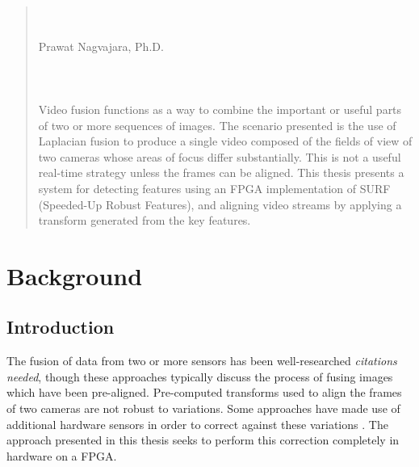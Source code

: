 \documentclass{article}
\begin{document}
\setcounter{page}{2}
\begin{center}
    \tableofcontents
    \clearpage
    
    \listoftables
    \clearpage
    
    \listoffigures
\end{center}
\clearpage

\hfill \\
\hfill \\
\hfill \\
\hfill \\


\begin{abstract}
    \singlespacing
    \centering
    \thetitle \\
    \theauthor \\
    Prawat Nagvajara, Ph.D. \\
    
    \hfill \\
    \hfill \\
    \hfill \\
    
    \doublespacing
    Video fusion functions as a way to combine the important or useful parts of two or more sequences of images. The scenario presented is the use of Laplacian fusion to produce a single video composed of the fields of view of two cameras whose areas of focus differ substantially. This is not a useful real-time strategy unless the frames can be aligned. This thesis presents a system for detecting features using an FPGA implementation of SURF (Speeded-Up Robust Features), and aligning video streams by applying a transform generated from the key features. 
\end{abstract}

\clearpage


\section{Background}

\subsection{Introduction}

The fusion of data from two or more sensors has been well-researched \textit{citations needed}, though these approaches typically discuss the process of fusing images which have been pre-aligned. Pre-computed transforms used to align the frames of two cameras are not robust to variations. Some approaches have made use of additional hardware sensors in order to correct against these variations \cite{chappell_exploiting_2006}. The approach presented in this thesis seeks to perform this correction completely in hardware on a FPGA.
\end{document}
